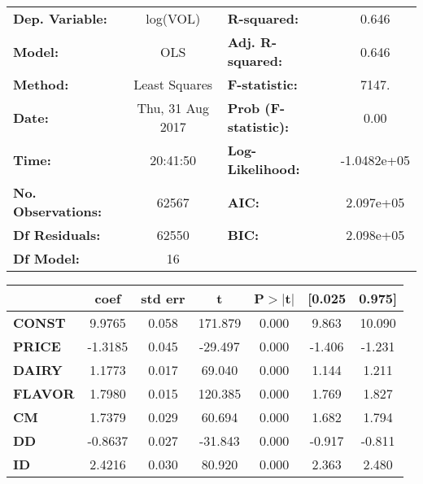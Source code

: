 \documentclass{article}
\begin{document}
\begin{center}
\begin{tabular}{lclc}
\toprule
\textbf{Dep. Variable:}    &        log(VOL)         & \textbf{  R-squared:         } &      0.646   \\
\textbf{Model:}            &       OLS        & \textbf{  Adj. R-squared:    } &      0.646   \\
\textbf{Method:}           &  Least Squares   & \textbf{  F-statistic:       } &      7147.   \\
\textbf{Date:}             & Thu, 31 Aug 2017 & \textbf{  Prob (F-statistic):} &      0.00    \\
\textbf{Time:}             &     20:41:50     & \textbf{  Log-Likelihood:    } & -1.0482e+05  \\
\textbf{No. Observations:} &       62567      & \textbf{  AIC:               } &  2.097e+05   \\
\textbf{Df Residuals:}     &       62550      & \textbf{  BIC:               } &  2.098e+05   \\
\textbf{Df Model:}         &          16      & \textbf{                     } &              \\
\bottomrule
\end{tabular}
\begin{tabular}{lcccccc}
               & \textbf{coef} & \textbf{std err} & \textbf{t} & \textbf{P$>$$|$t$|$} & \textbf{[0.025} & \textbf{0.975]}  \\
\midrule
\textbf{CONST} &       9.9765  &        0.058     &   171.879  &         0.000        &        9.863    &       10.090     \\
\textbf{PRICE}    &      -1.3185  &        0.045     &   -29.497  &         0.000        &       -1.406    &       -1.231     \\
\textbf{DAIRY}    &       1.1773  &        0.017     &    69.040  &         0.000        &        1.144    &        1.211     \\
\textbf{FLAVOR}    &       1.7980  &        0.015     &   120.385  &         0.000        &        1.769    &        1.827     \\
\textbf{CM}    &       1.7379  &        0.029     &    60.694  &         0.000        &        1.682    &        1.794     \\
\textbf{DD}    &      -0.8637  &        0.027     &   -31.843  &         0.000        &       -0.917    &       -0.811     \\
\textbf{ID}    &       2.4216  &        0.030     &    80.920  &         0.000        &        2.363    &        2.480     \\

\end{tabular}
\end{center}
\end{document}
